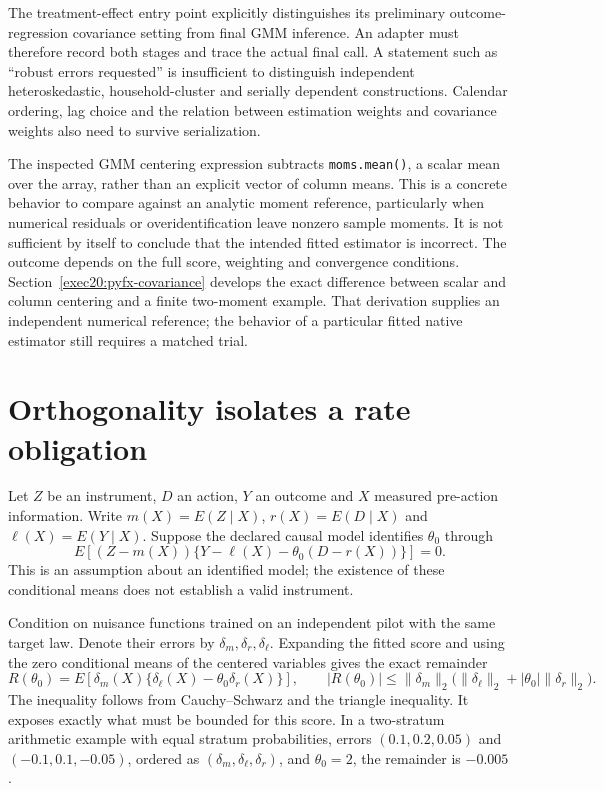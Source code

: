 The treatment-effect entry point explicitly distinguishes its preliminary
outcome-regression covariance setting from final GMM inference. An adapter must
therefore record both stages and trace the actual final call. A statement such
as ``robust errors requested'' is insufficient to distinguish independent
heteroskedastic, household-cluster and serially dependent constructions.
Calendar ordering, lag choice and the relation between estimation weights and
covariance weights also need to survive serialization. \citep{v13_sw_statsmodels,v131_sw_statsmodels}

The inspected GMM centering expression subtracts \texttt{moms.mean()}, a scalar
mean over the array, rather than an explicit vector of column means. This is
a concrete behavior to compare against an analytic moment reference, particularly
when numerical residuals or overidentification leave nonzero sample moments.
It is not sufficient by itself to conclude that the intended fitted estimator
is incorrect. The outcome depends on the full score, weighting and convergence
conditions. Section~\ref{exec20:pyfx-covariance} develops the exact difference
between scalar and column centering and a finite two-moment example. That
derivation supplies an independent numerical reference; the behavior of a
particular fitted native estimator still requires a matched trial.
\citep{v131_sw_statsmodels}

\section{Orthogonality isolates a rate obligation}

Let $Z$ be an instrument, $D$ an action, $Y$ an outcome and $X$ measured
pre-action information. Write $m(X)=E(Z\mid X)$, $r(X)=E(D\mid X)$ and
$\ell(X)=E(Y\mid X)$. Suppose the declared causal model identifies $\theta_0$
through
\[
 E[(Z-m(X))\{Y-\ell(X)-\theta_0(D-r(X))\}]=0.
\]
This is an assumption about an identified model; the existence of these
conditional means does not establish a valid instrument.

Condition on nuisance functions trained on an independent pilot with the same
target law. Denote their errors by $\delta_m,\delta_r,\delta_\ell$. Expanding
the fitted score and using the zero conditional means of the centered variables
gives the exact remainder
\[
 R(\theta_0)
 =E[\delta_m(X)\{\delta_\ell(X)-\theta_0\delta_r(X)\}],
 \qquad
 |R(\theta_0)|\leq
 \|\delta_m\|_2\bigl(\|\delta_\ell\|_2+|\theta_0|\|\delta_r\|_2\bigr).
\]
The inequality follows from Cauchy--Schwarz and the triangle inequality. It
exposes exactly what must be bounded for this score. In a two-stratum arithmetic
example with equal stratum probabilities, errors $(0.1,0.2,0.05)$ and
$(-0.1,0.1,-0.05)$, ordered as $(\delta_m,\delta_\ell,\delta_r)$, and
$\theta_0=2$, the remainder is $-0.005$. \citep{v131_project_semantics}

